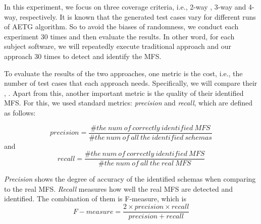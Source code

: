 \documentclass{sig-alternate}
\begin{document}
In this experiment, we focus on three coverage criteria, i.e., 2-way , 3-way and 4-way, respectively. It is known that the generated test cases vary for different runs of AETG algorithm. So to avoid the biases of randomness, we conduct each experiment 30 times and then evaluate the results.  In other word, for each subject software, we will repeatedly execute traditional approach and our approach 30 times to detect and identify the MFS.

To evaluate the results of the two approaches, one metric is the cost, i.e., the number of test cases that each approach needs. Specifically, we will compare their , .   Apart from this, another important metric is the quality of their identified MFS. For this, we used standard metrics: \emph{precision} and \emph{recall}, which are defined as follows:

$$precision =  \frac{\#the\ num\ of\ correctly\ identified\  MFS}{\#the\ num\ of\ all\ the\ identified\ schemas}$$
and
$$recall  =  \frac{\#the\ num\ of\ correctly\ identified\  MFS}{\#the\ num\ of\ all\ the\ real\ MFS} $$

\emph{Precision} shows the degree of accuracy of the identified schemas when comparing to the real MFS. \emph{Recall} measures how well the real MFS are detected and identified. The combination of them is F-measure, which is
$$F-measure = \frac{2 \times precision \times recall}{precision + recall}$$
%
%
%
%
\end{document}
